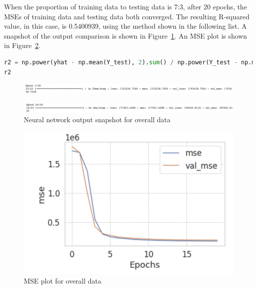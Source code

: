 \documentclass{scrartcl}
\begin{document}
\noindent When the proportion of training data to testing data is 7:3, after 20 epochs, the MSEs of training data and testing data both converged. The resulting R-squared value, in this case, is 0.5400939, using the method shown in the following list. A snapshot of the output comparison is shown in Figure~\ref{fig:NN7-8}. An MSE plot is shown in Figure~\ref{fig:net}. \\

\begin{lstlisting}[language=Python, caption= R-Squared output code, basicstyle=\tiny,captionpos=b]
r2 = np.power(yhat - np.mean(Y_test), 2).sum() / np.power(Y_test - np.mean(Y_test), 2).sum()
r2

\end{lstlisting}

\begin{figure}[H]
         \centering
         \includegraphics[width=\textwidth]{Graphics/Neural Network Images/NN7.png}
\end{figure}
     
\begin{figure}[H]
         \centering
         \includegraphics[width=\textwidth]{Graphics/Neural Network Images/NN8.png}
         \caption{Neural network output snapshot for overall data}
         \label{fig:NN7-8}
\end{figure}


\begin{figure}[H]
	\begin{center}
		\includegraphics[scale=1.0]{Graphics/Neural Network Images/NN6.png}
	\end{center}
	\caption{MSE plot for overall data}
	\label{fig:net}
\end{figure}
\end{document}
